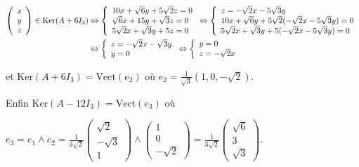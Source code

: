 {\begin{enumerate}
{   
\begin{align*}\ensuremath
\left(
\begin{array}{c}
x\\
y\\
z
\end{array}
\right)\in\text{Ker}(A+6I_3)&\Leftrightarrow\left\{
\begin{array}{l}
10x+\sqrt{6}y+5\sqrt{2}z=0\\
\sqrt{6}x+15y+\sqrt{3}z=0\\
5\sqrt{2}x+\sqrt{3}y+5z=0
\end{array}
\right.\Leftrightarrow\left\{
\begin{array}{l}
z=-\sqrt{2}x-5\sqrt{3}y\\
10x+\sqrt{6}y+5\sqrt{2}(-\sqrt{2}x-5\sqrt{3}y)=0\\
5\sqrt{2}x+\sqrt{3}y+5(-\sqrt{2}x-5\sqrt{3}y)=0
\end{array}
\right.\\
 &\Leftrightarrow\left\{
\begin{array}{l}
z=-\sqrt{2}x-\sqrt{3}y\\
y=0
\end{array}
\right.\Leftrightarrow\left\{
\begin{array}{l}
y=0\\
z=-\sqrt{2}x
\end{array}
\right.
\end{align*}

 
et $\text{Ker}(A+6I_3) =\text{Vect}(e_2)$ où $e_2=\frac{1}{\sqrt{3}}(1,0,-\sqrt{2})$.

Enfin $\text{Ker}(A-12I_3) =\text{Vect}(e_3)$ où 

\begin{center}
$e_3 =e_1\wedge e_2=\frac{1}{3\sqrt{2}}\left(
\begin{array}{c}
\sqrt{2}\\
-\sqrt{3}\\
1
\end{array}
\right)\wedge\left(
\begin{array}{c}
1\\
0\\
-\sqrt{2}
\end{array}
\right)=\frac{1}{3\sqrt{2}}\left(
\begin{array}{c}
\sqrt{6}\\
3\\
\sqrt{3}
\end{array}
\right)$.
\end{center}

}
\end{enumerate}}
